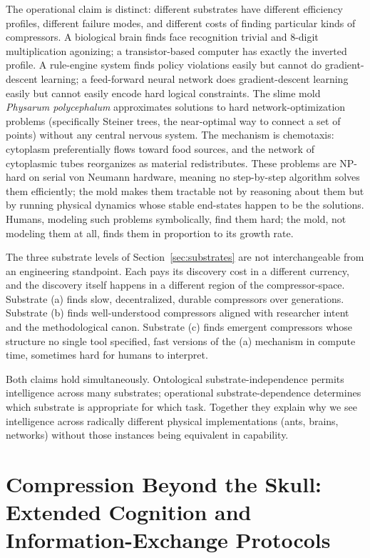 \documentclass[11pt]{article}
\begin{document}
The operational claim is distinct: different substrates have different efficiency profiles, different failure modes, and different costs of finding particular kinds of compressors. A biological brain finds face recognition trivial and 8-digit multiplication agonizing; a transistor-based computer has exactly the inverted profile. A rule-engine system finds policy violations easily but cannot do gradient-descent learning; a feed-forward neural network does gradient-descent learning easily but cannot easily encode hard logical constraints. The slime mold \emph{Physarum polycephalum} approximates solutions to hard network-optimization problems (specifically Steiner trees, the near-optimal way to connect a set of points) without any central nervous system. The mechanism is chemotaxis: cytoplasm preferentially flows toward food sources, and the network of cytoplasmic tubes reorganizes as material redistributes. These problems are NP-hard on serial von Neumann hardware, meaning no step-by-step algorithm solves them efficiently; the mold makes them tractable not by reasoning about them but by running physical dynamics whose stable end-states happen to be the solutions. Humans, modeling such problems symbolically, find them hard; the mold, not modeling them at all, finds them in proportion to its growth rate.

The three substrate levels of Section~\ref{sec:substrates} are not interchangeable from an engineering standpoint. Each pays its discovery cost in a different currency, and the discovery itself happens in a different region of the compressor-space. Substrate (a) finds slow, decentralized, durable compressors over generations. Substrate (b) finds well-understood compressors aligned with researcher intent and the methodological canon. Substrate (c) finds emergent compressors whose structure no single tool specified, fast versions of the (a) mechanism in compute time, sometimes hard for humans to interpret.

Both claims hold simultaneously. Ontological substrate-independence permits intelligence across many substrates; operational substrate-dependence determines which substrate is appropriate for which task. Together they explain why we see intelligence across radically different physical implementations (ants, brains, networks) without those instances being equivalent in capability.

\section{Compression Beyond the Skull: Extended Cognition and Information-Exchange Protocols}\label{sec:beyond_skull}
\end{document}
